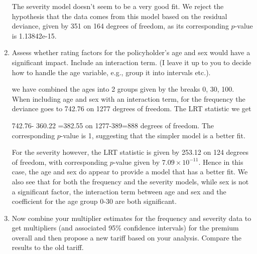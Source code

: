 \documentclass[11pt]{article}
\begin{document}
\begin{enumerate}
The severity model doesn't seem to be a very good fit. We reject the hypothesis that the data comes from this model based on the residual deviance, given by 351 on 164 degrees of freedom, as its corresponding $p$-value is 1.13842e-15.

\item Assess whether rating factors for the policyholder's age and sex would have a significant impact. Include an interaction term. (I leave it up to you to decide how to handle the age variable, e.g., group it into intervals etc.).

 we have combined the ages into 2 groups given by the breaks 0, 30, 100. When including age and sex with an interaction term, for the frequency the deviance goes to 742.76  on 1277 degrees of freedom. The LRT statistic we get

742.76- 360.22 =382.55 on 1277-389=888 degrees of freedom. The corresponding $p$-value is 1, suggesting that the simpler model is a better fit.

For the severity however, the LRT statistic is given by 253.12 on 124 degrees of freedom, with corresponding $p$-value given by $7.09 \times 10^{-11}$. Hence in this case, the age and sex do appear to provide a model that has a better fit. We also see that for  both the frequency and the severity models, while sex is not a significant factor, the interaction term between age and sex and the coefficient for the age group 0-30 are both significant.






\newpage
\item Now combine your multiplier estimates for the frequency and severity data to get multipliers (and associated 95\% confidence intervals) for the premium overall and then propose a new tariff based on your analysis. Compare the results to the old tariff.


\end{enumerate}
\end{document}
